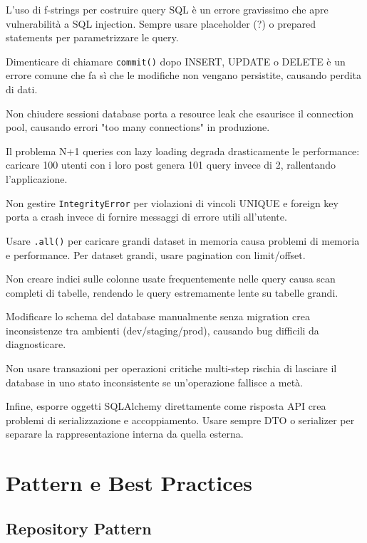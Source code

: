\begin{tcolorbox}[title=Errori Comuni]
L'uso di f-strings per costruire query SQL è un errore gravissimo che apre vulnerabilità a SQL injection. Sempre usare placeholder (?) o prepared statements per parametrizzare le query.

Dimenticare di chiamare \verb|commit()| dopo INSERT, UPDATE o DELETE è un errore comune che fa sì che le modifiche non vengano persistite, causando perdita di dati.

Non chiudere sessioni database porta a resource leak che esaurisce il connection pool, causando errori "too many connections" in produzione.

Il problema N+1 queries con lazy loading degrada drasticamente le performance: caricare 100 utenti con i loro post genera 101 query invece di 2, rallentando l'applicazione.

Non gestire \verb|IntegrityError| per violazioni di vincoli UNIQUE e foreign key porta a crash invece di fornire messaggi di errore utili all'utente.

Usare \verb|.all()| per caricare grandi dataset in memoria causa problemi di memoria e performance. Per dataset grandi, usare pagination con limit/offset.

Non creare indici sulle colonne usate frequentemente nelle query causa scan completi di tabelle, rendendo le query estremamente lente su tabelle grandi.

Modificare lo schema del database manualmente senza migration crea inconsistenze tra ambienti (dev/staging/prod), causando bug difficili da diagnosticare.

Non usare transazioni per operazioni critiche multi-step rischia di lasciare il database in uno stato inconsistente se un'operazione fallisce a metà.

Infine, esporre oggetti SQLAlchemy direttamente come risposta API crea problemi di serializzazione e accoppiamento. Usare sempre DTO o serializer per separare la rappresentazione interna da quella esterna.
\end{tcolorbox}

\section{Pattern e Best Practices}

\subsection{Repository Pattern}

